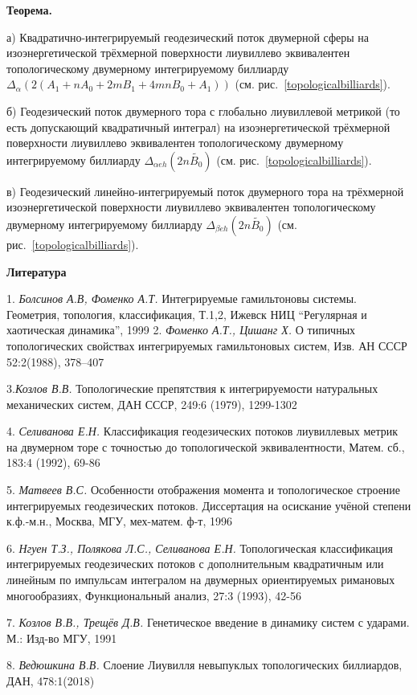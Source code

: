 \textbf{Теорема.}{\it

а) Квадратично-интегрируемый геодезический поток двумерной сферы на  изоэнергетической трёхмерной поверхности лиувиллево эквивалентен топологическому двумерному интегрируемому биллиарду   $\Delta_\alpha(2(A_1+nA_0+2mB_1+4mnB_0+A_1))   $ (см. рис.~\ref{topologicalbilliards}).

б) Геодезический поток двумерного тора с глобально лиувиллевой метрикой (то есть допускающий квадратичный интеграл) на изоэнергетической трёхмерной поверхности лиувиллево эквивалентен топологическому двумерному интегрируемому биллиарду $\Delta_{\alpha eh}(2n \widetilde{B_0})  $ (см. рис.~\ref{topologicalbilliards}).

в) Геодезический линейно-интегрируемый поток двумерного тора на трёхмерной изоэнергетической поверхности лиувиллево эквивалентен топологическому двумерному интегрируемому биллиарду  $\Delta_{\beta eh}(2n \widetilde{B_0})   $ (см. рис.~\ref{topologicalbilliards}).
}


\smallskip \centerline{\bf Литература}\nopagebreak



1. {\it Болсинов А.В, Фоменко А.Т.} Интегрируемые гамильтоновы системы.
Геометрия, топология, классификация, Т.1,2,
   Ижевск
   НИЦ ``Регулярная и хаотическая динамика'',
  1999
2. {\it  Фоменко А.Т., Цишанг Х.} О типичных топологических свойствах
интегрируемых гамильтоновых систем,  Изв. АН СССР
   52:2(1988),
  378--407

  3.{\it Козлов В.В. } Топологические препятствия к интегрируемости натуральных механических систем, ДАН СССР, 249:6 (1979), 1299-1302

  4. {\it Селиванова Е.Н. }Классификация геодезических потоков лиувиллевых метрик на двумерном торе с точностью до топологической эквивалентности,  Матем. сб., 183:4 (1992), 69-86

   5. {\it Матвеев В.С. } Особенности отображения момента и топологическое строение интегрируемых геодезических потоков. Диссертация на осискание учёной степени к.ф.-м.н.,  Москва, МГУ, мех-матем. ф-т, 1996

    6. {\it Нгуен Т.З., Полякова Л.С., Селиванова Е.Н.} Топологическая классификация интегрируемых геодезических потоков с дополнительным квадратичным или линейным по импульсам интегралом на двумерных ориентируемых римановых многообразиях, Функциональный анализ, 27:3 (1993), 42-56

  7. {\it Козлов В.В., Трещёв Д.В.} Генетическое  введение в динамику систем с ударами. М.: Изд-во МГУ, 1991

  8. {\it Ведюшкина В.В.} Слоение Лиувилля невыпуклых топологических биллиардов, ДАН, 478:1(2018)
